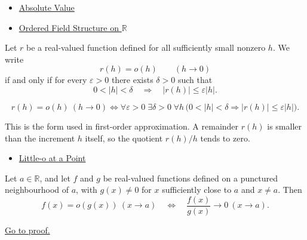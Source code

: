 \begin{dependencies}
\begin{itemize}
  \item \hyperref[def:absolute-value]{Absolute Value}
  \item \hyperref[def:real-ordered-field]{Ordered Field Structure on \(\mathbb{R}\)}
\end{itemize}
\end{dependencies}

\begin{definition}
\label{def:increment-little-o}
Let $r$ be a real-valued function defined for all sufficiently small nonzero
$h$. We write
\[
  r(h)=o(h)\qquad (h\to 0)
\]
if and only if for every $\varepsilon>0$ there exists $\delta>0$ such that
\[
  0<|h|<\delta
  \quad\Longrightarrow\quad
  |r(h)|\leq \varepsilon |h|.
\]
\end{definition}

\begin{remark*}
\[
r(h)=o(h)\ (h\to 0)
\Longleftrightarrow
\forall\varepsilon>0\;\exists\delta>0\;\forall h\,
\bigl(0<|h|<\delta\Rightarrow |r(h)|\leq \varepsilon |h|\bigr).
\]
\end{remark*}

\begin{remark*}[Interpretation]
This is the form used in first-order approximation. A remainder $r(h)$ is
smaller than the increment $h$ itself, so the quotient $r(h)/h$ tends to zero.
\end{remark*}

\begin{dependencies}
\begin{itemize}
  \item \hyperref[def:little-o-at-a-point]{Little-o at a Point}
\end{itemize}
\end{dependencies}

\begin{proposition}
\label{prop:little-o-quotient-characterization}
Let $a\in\mathbb{R}$, and let $f$ and $g$ be real-valued functions defined on a
punctured neighbourhood of $a$, with $g(x)\neq 0$ for $x$ sufficiently close to
$a$ and $x\neq a$. Then
\[
  f(x)=o(g(x))\ (x\to a)
  \quad\Longleftrightarrow\quad
  \frac{f(x)}{g(x)}\to 0\ (x\to a).
\]

\smallskip\noindent
\hyperref[prf:little-o-quotient-characterization]{Go to proof.}
\end{proposition}

